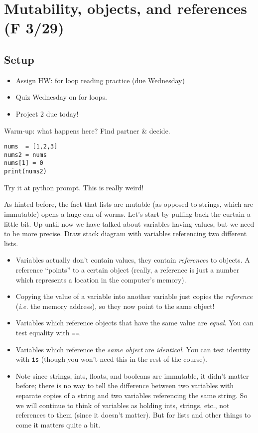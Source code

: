 \documentclass{article}
\newcommand{\ready}{\textcolor{Green}{\Checkmark}\xspace}
\begin{document}
\newpage

\section{\ready Mutability, objects, and references (F 3/29)}

\subsection*{Setup}

\begin{itemize}
\item Assign HW: for loop reading practice (due Wednesday)
\item Quiz Wednesday on for loops.
\item Project 2 due today!
\end{itemize}

Warm-up: what happens here?  Find partner \& decide.
\begin{verbatim}
nums  = [1,2,3]
nums2 = nums
nums[1] = 0
print(nums2)
\end{verbatim}

Try it at python prompt.  This is really weird!

As hinted before, the fact that lists are mutable (as opposed to
strings, which are immutable) opens a huge can of worms.  Let's start
by pulling back the curtain a little bit.  Up until now we have talked
about variables having values, but we need to be more precise.  Draw
stack diagram with variables referencing two different lists.

\begin{itemize}
\item Variables actually don't contain values, they contain
  \emph{references} to objects.  A reference ``points'' to a certain
  object (really, a reference is just a number which represents a
  location in the computer's memory).
\item Copying the value of a variable into another variable just
  copies the \emph{reference} (\emph{i.e.} the memory address), so they now
  point to the same object!
\item Variables which reference objects that have the same value are
  \emph{equal}.  You can test equality with \verb|==|.
\item Variables which reference the \emph{same object} are
  \emph{identical}. You can test identity with \verb|is| (though you
  won't need this in the rest of the course).
\item Note since strings, ints, floats, and booleans are immutable, it
  didn't matter before; there is no way to tell the difference between
  two variables with separate copies of a string and two variables
  referencing the same string.  So we will continue to think of
  variables as holding ints, strings, etc., not references to them
  (since it doesn't matter).  But for lists and other things to come
  it matters quite a bit.
\end{itemize}
\end{document}
